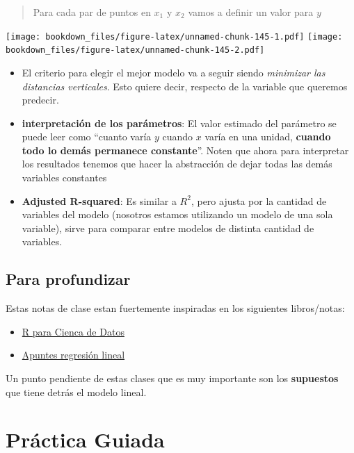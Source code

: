 \documentclass[]{book}
\providecommand{\tightlist}{%
  \setlength{\itemsep}{0pt}\setlength{\parskip}{0pt}}
\begin{document}
\begin{quote}
Para cada par de puntos en \(x_1\) y \(x_2\) vamos a definir un valor para \(y\)
\end{quote}

\texttt{[image: bookdown\_files/figure-latex/unnamed-chunk-145-1.pdf]} \texttt{[image: bookdown\_files/figure-latex/unnamed-chunk-145-2.pdf]}

\begin{itemize}
\item
  El criterio para elegir el mejor modelo va a seguir siendo \emph{minimizar las distancias verticales}. Esto quiere decir, respecto de la variable que queremos predecir.
\item
  \textbf{interpretación de los parámetros}: El valor estimado del parámetro se puede leer como ``cuanto varía \(y\) cuando \(x\) varía en una unidad, \textbf{cuando todo lo demás permanece constante}''. Noten que ahora para interpretar los resultados tenemos que hacer la abstracción de dejar todas las demás variables constantes
\item
  \textbf{Adjusted R-squared}: Es similar a \(R^2\), pero ajusta por la cantidad de variables del modelo (nosotros estamos utilizando un modelo de una sola variable), sirve para comparar entre modelos de distinta cantidad de variables.
\end{itemize}

\hypertarget{para-profundizar}{%
\subsection{Para profundizar}\label{para-profundizar}}

Estas notas de clase estan fuertemente inspiradas en los siguientes libros/notas:

\begin{itemize}
\tightlist
\item
  \href{https://es.r4ds.hadley.nz/}{R para Cienca de Datos}
\item
  \href{http://mate.dm.uba.ar/~meszre/apunte_regresion_lineal_szretter.pdf}{Apuntes regresión lineal}
\end{itemize}

Un punto pendiente de estas clases que es muy importante son los \textbf{supuestos} que tiene detrás el modelo lineal.

\hypertarget{practica-guiada-5}{%
\section{Práctica Guiada}\label{practica-guiada-5}}
\end{document}

